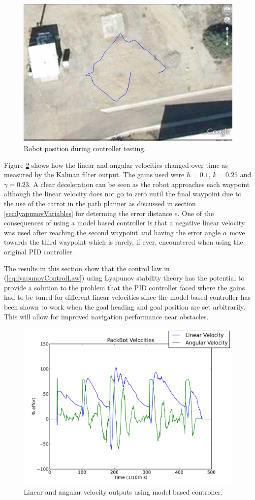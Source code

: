 \begin{figure}[ht!]
	\centering
	\includegraphics[width=.5\textwidth]{images/20100918_1717_GE_KF}
	\caption{Robot position during controller testing.}
	\label{fig:resultsLyapunovGEKF}
\end{figure}

Figure \ref{fig:resultsLyapunovVelocities} shows how the linear and angular velocities changed over time as measured by the Kalman filter output. The gains used were $h=0.1$, $k=0.25$ and $\gamma=0.23$. A clear deceleration can be seen as the robot approaches each waypoint although the linear velocity does not go to zero until the final waypoint due to the use of the carrot in the path planner as discussed in section \ref{sec:lyapunovVariables} for determing the error distance $e$. One of the consequences of using a model based controller is that a negative linear velocity was used after reaching the second waypoint and having the error angle $\alpha$ move towards the third waypoint which is rarely, if ever, encountered when using the original PID controller.

The results in this section show that the control law in (\ref{eq:lyapunovControlLaw}) using Lyapunov stability theory has the potential to provide a solution to the problem that the PID controller faced where the gains had to be tuned for different linear velocities since the model based controller has been shown to work when the goal heading and goal position are set arbitrarily. This will allow for improved navigation performance near obstacles.

\begin{figure}[ht!]
	\centering
	\includegraphics[width=.5\textwidth]{images/20100918_1717_velocities}
	\caption{Linear and angular velocity outputs using model based controller.}
	\label{fig:resultsLyapunovVelocities}
\end{figure}
